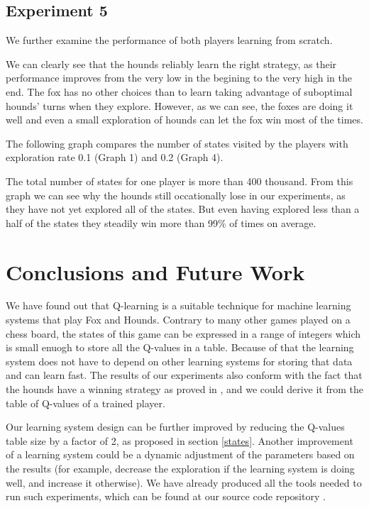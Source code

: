 \documentclass[a4paper]{article}
\begin{document}
\subsection{Experiment 5}
We further examine the performance of both players learning from scratch.









We can clearly see that the hounds reliably learn the right strategy, as their
performance improves from the very low in the begining to the very high in the
end. The fox has no other choices than to learn taking advantage of suboptimal
hounds' turns when they explore. However, as we can see, the foxes are doing it
well and even a small exploration of hounds can let the fox win most of the
times.

The following graph compares the number of states visited by the players with
exploration rate 0.1 (Graph 1) and 0.2 (Graph 4).



The total number of states for one player is more than 400 thousand. From this
graph we can see why the hounds still occationally lose in our experiments, as
they have not yet explored all of the states. But even having explored less
than a half of the states they steadily win more than 99\% of times on average.

\section{Conclusions and Future Work}
We have found out that Q-learning is a suitable technique for machine learning
systems that play Fox and Hounds. Contrary to many other games played on a chess
board, the states of this game can be expressed in a range of integers which is
small enuogh to store all the Q-values in a table. Because of that the learning
system does not have to depend on other learning systems for storing that data
and can learn fast. The results of our experiments also conform with the fact
that the hounds have a winning strategy as proved in \cite{berlekamp82}, and we
could derive it from the table of Q-values of a trained player.

Our learning system design can be further improved by reducing the Q-values
table size by a factor of 2, as proposed in section \ref{states}. Another
improvement of a learning system could be a dynamic adjustment of the
parameters based on the results (for example, decrease the exploration if the
learning system is doing well, and increase it otherwise). We have already
produced all the tools needed to run such experiments, which can be found at
our source code repository \cite{github}.
\end{document}
